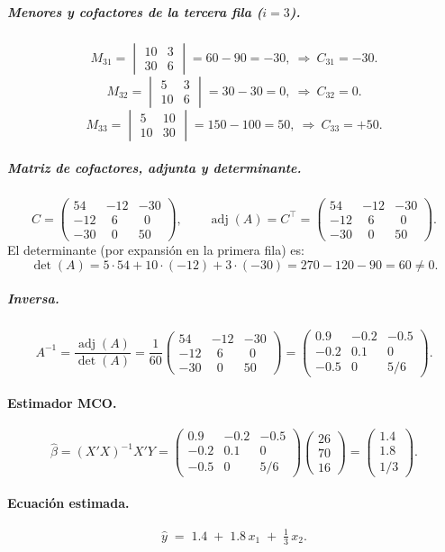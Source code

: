 \documentclass[11pt]{article}
\begin{document}
{\subparagraph{Menores y cofactores de la tercera fila (\(i=3\)).}
\[
M_{31}=\begin{vmatrix}10&3\\30&6\end{vmatrix}=60-90=-30,\ \Rightarrow\ C_{31}=-30.
\]
\[
M_{32}=\begin{vmatrix}5&3\\10&6\end{vmatrix}=30-30=0,\ \Rightarrow\ C_{32}=0.
\]
\[
M_{33}=\begin{vmatrix}5&10\\10&30\end{vmatrix}=150-100=50,\ \Rightarrow\ C_{33}=+50.
\]

\subparagraph{Matriz de cofactores, adjunta y determinante.}
\[
C=\begin{pmatrix}
54 & -12 & -30\\
-12& \ \ 6 & \ \ 0\\
-30& \ \ 0 & 50
\end{pmatrix},
\qquad
\operatorname{adj}(A)=C^\top=\begin{pmatrix}
54 & -12 & -30\\
-12& \ \ 6 & \ \ 0\\
-30& \ \ 0 & 50
\end{pmatrix}.
\]
El determinante (por expansión en la primera fila) es:
\[
\det(A)=5\cdot 54+10\cdot(-12)+3\cdot(-30)=270-120-90=60\neq 0.
\]

\subparagraph{Inversa.}
\[
A^{-1}=\frac{\operatorname{adj}(A)}{\det(A)}
=\frac{1}{60}\begin{pmatrix}
54 & -12 & -30\\
-12& \ \ 6 & \ \ 0\\
-30& \ \ 0 & 50
\end{pmatrix}
=
\begin{pmatrix}
0.9 & -0.2 & -0.5\\
-0.2& 0.1 & 0\\
-0.5& 0 & 5/6
\end{pmatrix}.
\]

\paragraph{Estimador MCO.}
\[
\hat\beta=(X'X)^{-1}X'Y
=
\begin{pmatrix}
0.9 & -0.2 & -0.5\\
-0.2& 0.1 & 0\\
-0.5& 0 & 5/6
\end{pmatrix}
\begin{pmatrix}
26\\ 70\\ 16
\end{pmatrix}
=
\begin{pmatrix}
1.4\\ 1.8\\ 1/3
\end{pmatrix}.
\]

\paragraph{Ecuación estimada.}
\[
\hat y \;=\; 1.4 \;+\; 1.8\,x_1 \;+\; \tfrac{1}{3}\,x_2.
\]

}
\end{document}
